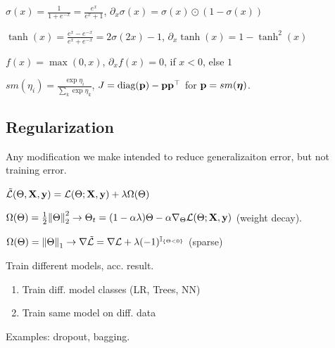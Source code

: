 \begin{definition}[Sigmoid]
    \(\sigma(x) = \frac{1}{1 + e^{-x}} = \frac{e^x}{e^x + 1}\), \(\partial_x \sigma(x) = \sigma(x) \odot (1 - \sigma(x))\)
\end{definition}

\begin{definition}[Tanh]
    \(\tanh(x) = \frac{e^x - e^{-x}}{e^x + e^{-x}} = 2\sigma(2x) - 1\), \(\partial_x \tanh(x) = 1 - \tanh^2(x)\)
\end{definition}

\begin{definition}[Relu]
    \(f(x) = \max(0, x)\), \(\partial_x f(x) = 0\), if \(x < 0\), else \(1\)
\end{definition}

\begin{definition}[Softmax]
    \(sm(\eta_i) = \frac{\exp\eta_i}{\sum_k \exp \eta_k}\), \(J = \text{diag} (\vb p) - \vb p \vb p^\top\) for \(\vb p = sm(\vb*{\eta})\).
\end{definition}

\subsection{Regularization}
Any modification we make intended to reduce generalizaiton error, but not training error.
\begin{center}
    \(\tilde {\mathcal{L}}(\Theta, \vb{X}, \vb{y}) = \mathcal{L}(\Theta; \vb{X}, \vb{y}) + \lambda \Omega(\Theta)\)
\end{center}

\begin{definition}[Ridge]
    \(\Omega(\Theta) = \frac{1}{2} \norm{\Theta}_2^2 \to \Theta_t = (1 - \alpha \lambda)\Theta - \alpha \nabla_\Theta \mathcal{L}(\Theta; \vb{X}, \vb{y})\) (weight decay).
\end{definition}

\begin{definition}[Lasso]
    \(\Omega(\Theta) = \norm{\Theta}_1 \to \nabla \tilde {\mathcal{L}} = \nabla \mathcal{L} + \lambda (-1)^{\mathbb{I}_{\{\Theta < 0\}}}\) (sparse)
\end{definition}

\begin{definition}
    Train different models, acc. result.
    \begin{enumerate}
        \item Train diff. model classes (LR, Trees, NN)
        \item Train same model on diff. data
    \end{enumerate}
    Examples: dropout, bagging.
\end{definition}

